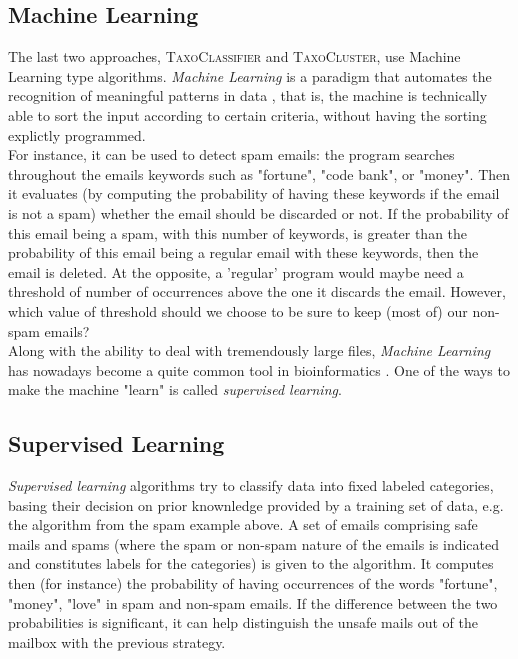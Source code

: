 \documentclass{report}
\begin{document}
\subsection{Machine Learning}

The last two approaches, \textsc{TaxoClassifier} and \textsc{TaxoCluster}, use Machine Learning type algorithms. \emph{Machine Learning} is a paradigm that automates the recognition of meaningful patterns in data \cite{SSS}, that is, the machine is technically able to sort the input according to certain criteria, without having the sorting explictly programmed.\\

For instance, it can be used to detect spam emails: the program searches throughout the emails keywords such as "fortune", "code bank", or "money". Then it evaluates (by computing the probability of having these keywords if the email is not a spam) whether the email should be discarded or not. If the probability of this email being a spam, with this number of keywords, is greater than the probability of this email being a regular email with these keywords, then the email is deleted. At the opposite, a 'regular' program would maybe need a threshold of number of occurrences above the one it discards the email. However, which value of threshold should we choose to be sure to keep (most of) our non-spam emails?\\

Along with the ability to deal with tremendously large files, \emph{Machine Learning} has nowadays become a quite common tool in bioinformatics \cite{Nikolski}. One of the ways to make the machine "learn" is called \emph{supervised learning}. 

\subsection{Supervised Learning}

\emph{Supervised learning} algorithms try to classify data into fixed labeled categories, basing their decision on prior knownledge provided by a training set of data, e.g. the algorithm from the spam example above. A set of emails comprising safe mails and spams (where the spam or non-spam nature of the emails is indicated and constitutes labels for the categories) is given to the algorithm. It computes then (for instance) the probability of having occurrences of the words "fortune", "money", "love" in spam and non-spam emails. If the difference between the two probabilities is significant, it can help distinguish the unsafe mails out of the mailbox with the previous strategy.\\
\end{document}
